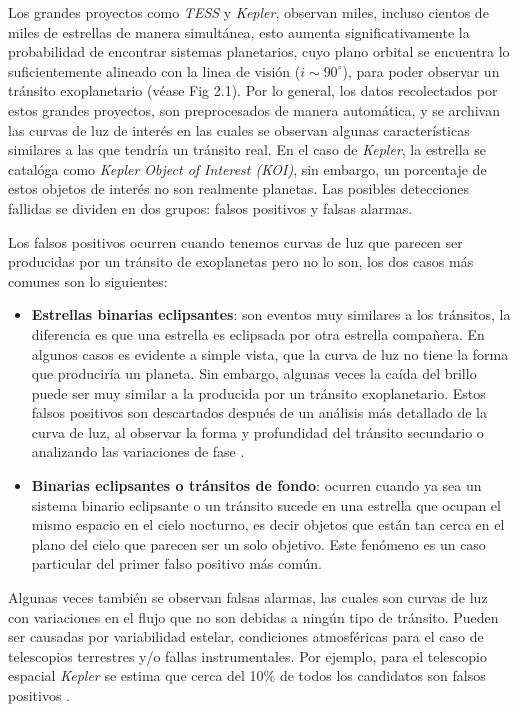 Los grandes proyectos como \textit{TESS} y \textit{Kepler}, observan miles, incluso cientos de miles de estrellas de manera simultánea, esto aumenta significativamente la probabilidad de encontrar sistemas planetarios, cuyo plano orbital se encuentra lo suficientemente alineado con la linea de visión ($i\sim 90^{\circ}$), para poder observar un tránsito exoplanetario (véase Fig 2.1). Por lo general, los datos recolectados por estos grandes proyectos, son preprocesados de manera automática, y se archivan las curvas de luz de interés en las cuales se observan algunas características similares a las que tendría un tránsito real. En el caso de \textit{Kepler}, la estrella se catalóga como \textit{Kepler Object of Interest (KOI)}, sin embargo, un porcentaje de estos objetos de interés no son realmente planetas. Las posibles detecciones fallidas se dividen en dos grupos: falsos positivos y falsas alarmas.

Los falsos positivos ocurren cuando tenemos curvas de luz que parecen ser producidas por un tránsito de exoplanetas pero no lo son, los dos casos más comunes son lo siguientes:

\begin{itemize}
\item \textbf{Estrellas binarias eclipsantes}: son eventos muy similares a los tránsitos, la diferencia es que una estrella es eclipsada por otra estrella compañera. En algunos casos es evidente a simple vista, que la curva de luz no tiene la forma que produciría un planeta. Sin embargo, algunas veces la caída del brillo puede ser muy similar a la producida por un tránsito exoplanetario. Estos falsos positivos son descartados después de un análisis más detallado de la curva de luz, al observar la forma y profundidad del tránsito secundario o analizando las variaciones de fase \cite{bryson2017kepler}.
\item \textbf{Binarias eclipsantes o tránsitos de fondo}: ocurren cuando ya sea un sistema binario eclipsante o un tránsito sucede en una estrella que ocupan el mismo espacio en el cielo nocturno, es decir objetos que están tan cerca en el plano del cielo que parecen ser un solo objetivo. Este fenómeno es un caso particular del primer falso positivo más común.
\end{itemize}

Algunas veces también se observan falsas alarmas, las cuales son curvas de luz con variaciones en el flujo que no son debidas a ningún tipo de tránsito. Pueden ser causadas por variabilidad estelar, condiciones atmosféricas para el caso de telescopios terrestres y/o fallas instrumentales. Por ejemplo, para el telescopio espacial \textit{Kepler} se estima que cerca del 10\% de todos los candidatos son falsos positivos \cite{fressin2013false}.


